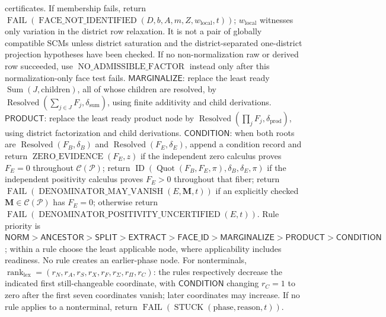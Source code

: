 certificates. If membership fails, return \(\operatorname{FAIL}(\operatorname{FACE\_NOT\_IDENTIFIED}(D,b,A,m,Z,w_{\mathrm{local}},t))\); \(w_{\mathrm{local}}\) witnesses only variation in the district row relaxation.  It is not a pair of globally compatible SCMs unless district saturation and the district-separated one-district projection hypotheses have been checked. If no non-normalization raw or derived row succeeded, use \(\operatorname{NO\_ADMISSIBLE\_FACTOR}\) instead only after this normalization-only face test fails. \(\mathsf{MARGINALIZE}\): replace the least ready \(\operatorname{Sum}(J,\mathrm{children})\), all of whose children are resolved, by \(\operatorname{Resolved}(\sum_{j\in J}F_j,\delta_{\mathrm{sum}})\), using finite additivity and child derivations. \(\mathsf{PRODUCT}\): replace the least ready product node by \(\operatorname{Resolved}(\prod_jF_j,\delta_{\mathrm{prod}})\), using district factorization and child derivations. \(\mathsf{CONDITION}\): when both roots are \(\operatorname{Resolved}(F_B,\delta_B)\) and \(\operatorname{Resolved}(F_E,\delta_E)\), append a condition record and return \(\operatorname{ZERO\_EVIDENCE}(F_E,z)\) if the independent zero calculus proves \(F_E=0\) throughout \(\mathcal C(\mathcal P)\); return \(\operatorname{ID}(\operatorname{Quot}(F_B,F_E,\pi),\delta_B,\delta_E,\pi)\) if the independent positivity calculus proves \(F_E>0\) throughout that fiber; return \(\operatorname{FAIL}(\operatorname{DENOMINATOR\_MAY\_VANISH}(E,\mathbf M,t))\) if an explicitly checked \(\mathbf M\in\mathcal C(\mathcal P)\) has \(F_E=0\); otherwise return \(\operatorname{FAIL}(\operatorname{DENOMINATOR\_POSITIVITY\_UNCERTIFIED}(E,t))\). Rule priority is \(\mathsf{NORM}>\mathsf{ANCESTOR}>\mathsf{SPLIT}>\mathsf{EXTRACT}>\mathsf{FACE\_ID}>\mathsf{MARGINALIZE}>\mathsf{PRODUCT}>\mathsf{CONDITION}\); within a rule choose the least applicable node, where applicability includes readiness. No rule creates an earlier-phase node. For nonterminals, \(\operatorname{rank}_{\mathrm{lex}}=(r_N,r_A,r_S,r_X,r_F,r_{\Sigma},r_{\Pi},r_C)\): the rules respectively decrease the indicated first still-changeable coordinate, with \(\mathsf{CONDITION}\) changing \(r_C=1\) to zero after the first seven coordinates vanish; later coordinates may increase. If no rule applies to a nonterminal, return \(\operatorname{FAIL}(\operatorname{STUCK}(\mathrm{phase},\mathrm{reason},t))\).